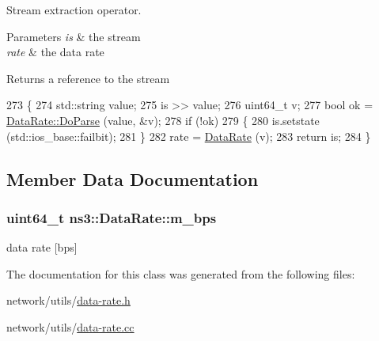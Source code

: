 Stream extraction operator. 


\begin{DoxyParams}{Parameters}
{\em is} & the stream \\
\hline
{\em rate} & the data rate \\
\hline
\end{DoxyParams}
\begin{DoxyReturn}{Returns}
a reference to the stream 
\end{DoxyReturn}

\begin{DoxyCode}
273 \{
274   std::string value;
275   is >> value;
276   uint64\_t v;
277   \textcolor{keywordtype}{bool} ok = \hyperlink{classns3_1_1DataRate_a2714f3be344bbae7ace310b1a8412ed8}{DataRate::DoParse} (value, &v);
278   \textcolor{keywordflow}{if} (!ok)
279     \{
280       is.setstate (std::ios\_base::failbit);
281     \}
282   rate = \hyperlink{classns3_1_1DataRate_abe139e6335e5ad820d35b24da7f06325}{DataRate} (v);
283   \textcolor{keywordflow}{return} is;
284 \}
\end{DoxyCode}


\subsection{Member Data Documentation}
\subsubsection[{\texorpdfstring{m\+\_\+bps}{m_bps}}]{\setlength{\rightskip}{0pt plus 5cm}uint64\+\_\+t ns3\+::\+Data\+Rate\+::m\+\_\+bps\hspace{0.3cm}{\ttfamily [private]}}\hypertarget{classns3_1_1DataRate_a2e1b49f1dd2e145d8923a368e9e21c01}{}\label{classns3_1_1DataRate_a2e1b49f1dd2e145d8923a368e9e21c01}


data rate \mbox{[}bps\mbox{]} 



The documentation for this class was generated from the following files\+:\begin{DoxyCompactItemize}
\item 
network/utils/\hyperlink{data-rate_8h}{data-\/rate.\+h}\item 
network/utils/\hyperlink{data-rate_8cc}{data-\/rate.\+cc}\end{DoxyCompactItemize}
